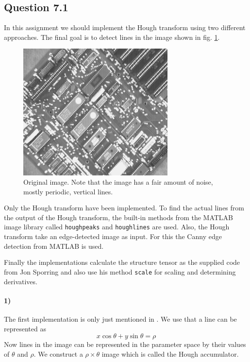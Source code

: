 \documentclass[a4paper, 10pt, final]{article}
\title{\mytitle}
\subtitle{\mysubtitle}
\author{\myauthor{} - \mymail}
\date{\mydate}
\begin{document}
\maketitle

\subsection*{Question 7.1}
In this assignment we should implement the Hough transform using two
different approaches. The final goal is to detect lines in the image
shown in fig. \ref{apple}.

\begin{figure}[h!]
    \centering
    \includegraphics[angle=0,width=0.7\textwidth]{images/apple}
    \caption{Original image. Note that the image has a fair amount of
    noise, mostly periodic, vertical lines.}
    \label{apple}
\end{figure}

Only the Hough transform have been implemented. To find the
actual lines from the output of the Hough transform, the built-in
methods from the MATLAB image library called \texttt{houghpeaks} and
\texttt{houghlines} are used. Also, the Hough transform take an
edge-detected image as input. For this the Canny edge detection from
MATLAB is used.

Finally the implementations calculate the structure tensor as the
supplied code from Jon Sporring and also use his method \texttt{scale}
for scaling and determining derivatives.

\paragraph{1)}
The first implementation is only just mentioned in \citep[section
16.5.2, p. 458-460]{jahne-digital}. We use that a line can be
represented as
\begin{equation}
    x\cos\theta+y\sin\theta = \rho
\end{equation}
Now lines in the image can be represented in the parameter space by
their values of $\theta$ and $\rho$. We construct a $\rho\times\theta$
image which is called the Hough accumulator.
\end{document}
